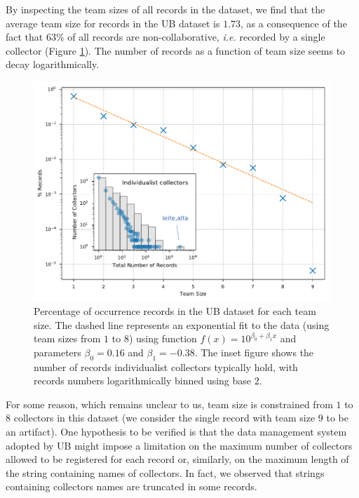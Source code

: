 By inspecting the team sizes of all records in the dataset, we find that the average team size for records in the UB dataset is $1.73$, as a consequence of the fact that $63\%$ of all records are non-collaborative, \textit{i.e.} recorded by a single collector (Figure \ref{fig:ub_team_sizes}).
The number of records as a function of team size seems to decay logarithmically.
\begin{figure}[!ht]
  	\centering
    \includegraphics[width=0.9\linewidth]{figures/casestudy_ub/team_sizes.pdf}
    \caption[Percentage of occurrence records in the UB dataset for each team size]{ Percentage of occurrence records in the UB dataset for each team size. The dashed line represents an exponential fit to the data (using team sizes from $1$ to $8$) using function $f(x) = 10^{\beta_0 + \beta_1 x}$ and parameters $\beta_0=0.16$ and $\beta_1=-0.38$. The inset figure shows the number of records individualist collectors typically hold, with records numbers logarithmically binned using base $2$. }
    \label{fig:ub_team_sizes}
\end{figure}
%
For some reason, which remains unclear to us, team size is constrained from $1$ to $8$ collectors in this dataset (we consider the single record with team size $9$ to be an artifact).
One hypothesis to be verified is that the data management system adopted by UB might impose a limitation on the maximum number of collectors allowed to be registered for each record or, similarly, on the maximum length of the string containing names of collectors. 
In fact, we observed that strings containing collectors names are truncated in some records.


